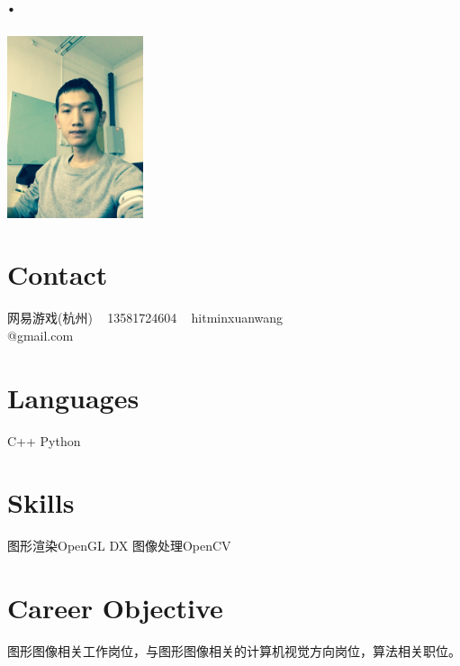 \documentclass[]{cv-style} %
\begin{document}
\header{ }{  }
\begin{aside}
\section{.}
\includegraphics[width=4cm]{mathen}
\section{Contact}
网易游戏(杭州)
~
13581724604
~
hitminxuanwang\\@gmail.com
\section{Languages}
C++
Python
\section{Skills}
图形渲染OpenGL DX
图像处理OpenCV
\end{aside}
\section{Career Objective}
  \vspace{-0.2cm}
  \hspace{0.2cm}图形图像相关工作岗位，与图形图像相关的计算机视觉方向岗位，算法相关职位。
\end{document}
